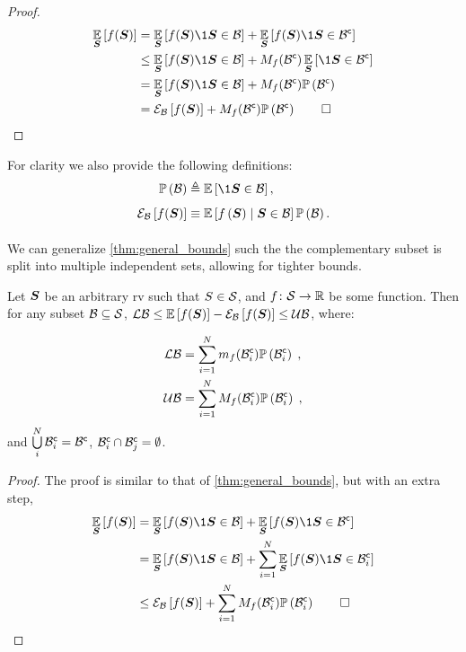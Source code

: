 \begin{proof}
	\begin{align*}
		\expectation{f(\RV)}{\RV} & = \expectation{f(\RV)\1{\RV\in \subSpace}}{\RV}+ \expectation{f(\RV)\1{\RV\in \stcomp{\subSpace}}}{\RV}
		\\
		& \leq \expectation{f(\RV)\1{\RV\in \subSpace}}{\RV} +M_f(\stcomp{\subSpace})\expectation{\1{\RV\in \stcomp{\subSpace}}}{\RV}
		\\
		& =\expectation{f(\RV)\1{\RV\in \subSpace}}{\RV} +M_f(\stcomp{\subSpace})\measure{\stcomp{\subSpace}}
		\\
		& =\partialexpectation{f(\RV)}{\subSpace} +M_f(\stcomp{\subSpace})\measure{\stcomp{\subSpace}}\qed
	\end{align*}
\end{proof}

For clarity we also provide the following definitions:
\begin{align*}
	\measure{\subSpace} & \triangleq \expectation{\1{\RV\in \subSpace}}{},\\
	\partialexpectation{f(\RV)}{\subSpace} &\equiv\expectation{f\left(\RV\right)\mid\RV\in\subSpace}{}\measure{\subSpace}.
\end{align*}

We can generalize \cref{thm:general_bounds} such the the complementary subset is split into multiple independent sets, allowing for tighter bounds.

\begin{theorem}
	\label{thm:general_bounds_multi}
	Let $\boldsymbol S$ be an arbitrary \gls{rv} such that $S\in\mathcal S$, and  $f\colon\mathcal S\to\mathbb{R}$ be some function. Then for any subset $\mathcal B\subseteq\mathcal S$, $\operatorname*{\mathcal{LB}}\leq\operatorname*{\mathbb{E}}\limits_{}\left[{f(\boldsymbol S)}\right]-\mathcal{E}_{\mathcal B}\left[{f(\boldsymbol S)}\right]\leq\operatorname*{\mathcal{UB}}$, where:
	\begin{subequations}
		\begin{align}
			\operatorname*{\mathcal{LB}} & = \sum_{i=1}^Nm_f({\mathcal B}^{\mathsf{c}}_{i})\mathbb{P}\left({{\mathcal B}^{\mathsf{c}}_{i}}\right)\;,
			\\
			\operatorname*{\mathcal{UB}} & = \sum_{i=1}^NM_f({\mathcal B}^{\mathsf{c}}_{i})\mathbb{P}\left({{\mathcal B}^{\mathsf{c}}_{i}}\right)\;,
		\end{align}
	\end{subequations}
	and $\bigcup\limits_i^N{\mathcal B}^{\mathsf{c}}_{i}={\mathcal B}^{\mathsf{c}}$, ${\mathcal B}^{\mathsf{c}}_{i}\cap{\ensuremath{\mathcal B}}^{\mathsf{c}}_j=\emptyset$.
\end{theorem}
\begin{proof}
	The proof is similar to that of \cref{thm:general_bounds}, but with an extra step,
	\begin{align*}
		\expectation{f(\RV)}{\RV} & = \expectation{f(\RV)\1{\RV\in \subSpace}}{\RV}+ \expectation{f(\RV)\1{\RV\in \stcomp{\subSpace}}}{\RV}
		\\&=\expectation{f(\RV)\1{\RV\in \subSpace}}{\RV}+\sum_{i=1}^N\expectation{f(\RV)\1{\RV\in \stcompI{\subSpace}{i}}}{\RV}\\
		&\leq\partialexpectation{f(\RV)}{\subSpace} +\sum_{i=1}^NM_f(\stcompI{\subSpace}{i})\measure{\stcompI{\subSpace}{i}}\qed
	\end{align*}
\end{proof}

